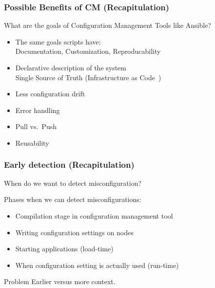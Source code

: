 \begin{frame}
	\frametitle{Possible Benefits of CM (Recapitulation)}

	\begin{task}
	What are the goals of Configuration Management Tools like Ansible?
	\end{task}

	\pause

	\begin{itemize} %
	\item The same goals scripts have: \\
		Documentation, Customization, Reproducability
	\item Declarative description of the system \\
		Single Source of Truth 
		(Infrastructure as Code~\cite{waldemar2013testing})
	\item Less configuration drift
	\item Error handling
	\item Pull vs.\ Push
	\item Reusability
	\end{itemize}
\end{frame}

\begin{frame}
	\frametitle{Early detection (Recapitulation)}
	\begin{task}
	When do we want to detect misconfiguration?
	\end{task}

	\pause

	Phases when we can detect misconfigurations:
	\begin{itemize} %
	\item Compilation stage in configuration management tool
	\item Writing configuration settings on nodes
	\item Starting applications (load-time)
	\item When configuration setting is actually used (run-time)
	\end{itemize}

	\pause[\thebeamerpauses]

	\begin{alertblock}{Problem}
	Earlier versus more context.
	\end{alertblock}
\end{frame}


